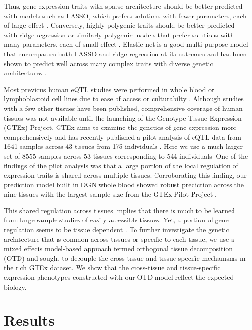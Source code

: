 \documentclass[10pt,letterpaper]{article}
\begin{document}
Thus, gene expression traits with sparse architecture should be better predicted with models such as LASSO, which prefers solutions with fewer parameters, each of large effect \cite{Tibshirani_1996}. Conversely, highly polygenic traits should be better predicted with ridge regression or similarly polygenic models that prefer solutions with many parameters, each of small effect \cite{Hoerl_1970,de_los_Campos_2010,Wheeler_2014}. Elastic net \cite{Zou_2005} is a good multi-purpose model that encompasses both LASSO and ridge regression at its extremes and has been shown to predict well across many complex traits with diverse genetic architectures \cite{abraham2013performance}. 

Most previous human eQTL studies were performed in whole blood or lymphoblastoid cell lines due to ease of access or culturabilty \cite{Stranger_2007,Cheung_2005,Battle_2013}. Although studies with a few other tissues have been published, comprehensive coverage of human tissues was not available until the launching of the Genotype-Tissue Expression (GTEx) Project. GTEx aims to examine the genetics of gene expression more comprehensively and has recently published a pilot analysis of eQTL data from 1641 samples across 43 tissues from 175 individuals \cite{Ardlie_2015}. Here we use a much larger set of 8555 samples across 53 tissues corresponding to 544 individuals. One of the findings of the pilot analysis was that a large portion of the local regulation of expression traits is shared across multiple tissues. Corroborating this finding, our prediction model built in DGN whole blood showed robust prediction \cite{Gamazon_2015} across the nine tissues with the largest sample size from the GTEx Pilot Project \cite{Ardlie_2015}.

This shared regulation across tissues implies that there is much to be learned from large sample studies of easily accessible tissues. Yet, a portion of gene regulation seems to be tissue dependent \cite{Ardlie_2015}. To further investigate the genetic architecture that is common across tissues or specific to each tissue, we use a mixed effects model-based approach termed orthogonal tissue decomposition (OTD) and sought to decouple the cross-tissue and tissue-specific mechanisms in the rich GTEx dataset. We show that the cross-tissue and tissue-specific expression phenotypes constructed with our OTD model reflect the expected biology. 

\section*{Results}
\end{document}
